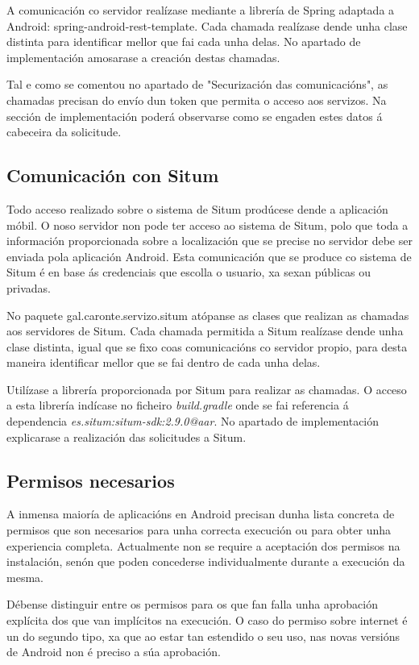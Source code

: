 A comunicación co servidor realízase mediante a librería de Spring adaptada a Android: spring-android-rest-template. Cada chamada realízase dende unha clase distinta para identificar mellor que fai cada unha delas. No apartado de implementación amosarase a creación destas chamadas.

Tal e como se comentou no apartado de "Securización das comunicacións", as chamadas precisan do envío dun token que permita o acceso aos servizos. Na sección de implementación poderá observarse como se engaden estes datos á cabeceira da solicitude.


\subsection{Comunicación con Situm}
Todo acceso realizado sobre o sistema de Situm prodúcese dende a aplicación móbil. O noso servidor non pode ter acceso ao sistema de Situm, polo que toda a información proporcionada sobre a localización que se precise no servidor debe ser enviada pola aplicación Android. Esta comunicación que se produce co sistema de Situm é en base ás credenciais que escolla o usuario, xa sexan públicas ou privadas.

No paquete gal.caronte.servizo.situm atópanse as clases que realizan as chamadas aos servidores de Situm. Cada chamada permitida a Situm realízase dende unha clase distinta, igual que se fixo coas comunicacións co servidor propio, para desta maneira identificar mellor que se fai dentro de cada unha delas.

Utilízase a librería proporcionada por Situm para realizar as chamadas. O acceso a esta librería indícase no ficheiro \emph{build.gradle} onde se fai referencia á dependencia \emph{es.situm:situm-sdk:2.9.0@aar}. No apartado de implementación explicarase a realización das solicitudes a Situm.

\subsection{Permisos necesarios}
A inmensa maioría de aplicacións en Android precisan dunha lista concreta de permisos que son necesarios para unha correcta execución ou para obter unha experiencia completa. Actualmente non se require a aceptación dos permisos na instalación, senón que poden concederse individualmente durante a execución da mesma.

Débense distinguir entre os permisos para os que fan falla unha aprobación explícita dos que van implícitos na execución. O caso do permiso sobre internet é un do segundo tipo, xa que ao estar tan estendido o seu uso, nas novas versións de Android non é preciso a súa aprobación.

